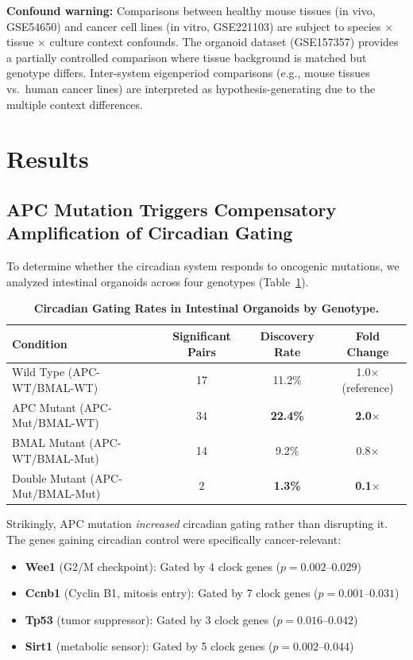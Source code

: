 \documentclass[11pt,letterpaper]{article}
\begin{document}
\textbf{Confound warning:} Comparisons between healthy mouse tissues (in vivo, GSE54650) and cancer cell lines (in vitro, GSE221103) are subject to species $\times$ tissue $\times$ culture context confounds. The organoid dataset (GSE157357) provides a partially controlled comparison where tissue background is matched but genotype differs. Inter-system eigenperiod comparisons (e.g., mouse tissues vs.\ human cancer lines) are interpreted as hypothesis-generating due to the multiple context differences.

\section{Results}

\subsection{APC Mutation Triggers Compensatory Amplification of Circadian Gating}

To determine whether the circadian system responds to oncogenic mutations, we analyzed intestinal organoids across four genotypes (Table~\ref{tab:intestinal}).

\begin{table}[H]
\centering
\caption{\textbf{Circadian Gating Rates in Intestinal Organoids by Genotype.}}
\label{tab:intestinal}
\begin{tabular}{lccc}
\toprule
\textbf{Condition} & \textbf{Significant Pairs} & \textbf{Discovery Rate} & \textbf{Fold Change} \\
\midrule
Wild Type (APC-WT/BMAL-WT) & 17 & 11.2\% & 1.0$\times$ (reference) \\
APC Mutant (APC-Mut/BMAL-WT) & 34 & \textbf{22.4\%} & \textbf{2.0$\times$} \\
BMAL Mutant (APC-WT/BMAL-Mut) & 14 & 9.2\% & 0.8$\times$ \\
Double Mutant (APC-Mut/BMAL-Mut) & 2 & \textbf{1.3\%} & \textbf{0.1$\times$} \\
\bottomrule
\end{tabular}
\end{table}

Strikingly, APC mutation \textit{increased} circadian gating rather than disrupting it. The genes gaining circadian control were specifically cancer-relevant:
\begin{itemize}[noitemsep]
    \item \textbf{Wee1} (G2/M checkpoint): Gated by 4 clock genes ($p = 0.002$--$0.029$)
    \item \textbf{Ccnb1} (Cyclin B1, mitosis entry): Gated by 7 clock genes ($p = 0.001$--$0.031$)
    \item \textbf{Tp53} (tumor suppressor): Gated by 3 clock genes ($p = 0.016$--$0.042$)
    \item \textbf{Sirt1} (metabolic sensor): Gated by 5 clock genes ($p = 0.002$--$0.044$)
\end{itemize}
\end{document}
